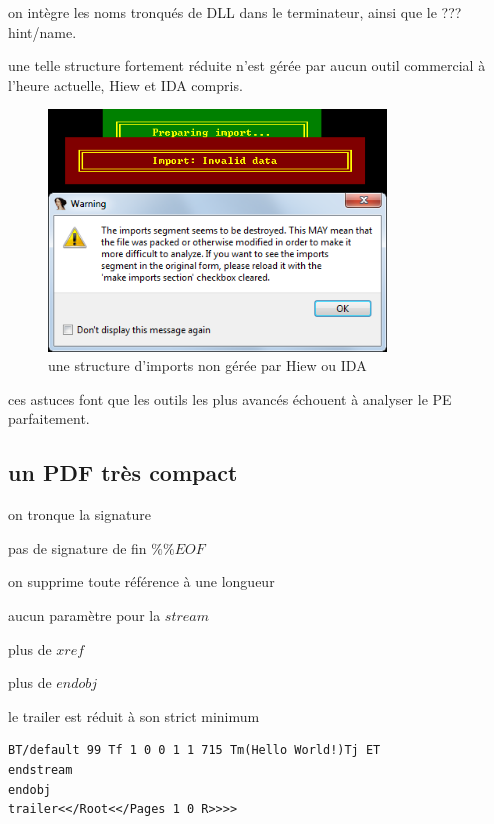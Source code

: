 \begin{itemize}
on intègre les noms tronqués de DLL dans le terminateur, ainsi que le ??? hint/name.

une telle structure fortement réduite n'est gérée par aucun outil commercial à l'heure actuelle, Hiew et IDA compris.

\begin{figure}[ht]
  \centering
  \includegraphics[width=0.8\textwidth]{albertini/img/imports_error}
  \caption{une structure d'imports non gérée par Hiew ou IDA}
  \label{fig:albertini:imports_error}
\end{figure}

ces astuces font que les outils les plus avancés échouent à analyser le PE parfaitement.

\end{itemize}

\subsection{un PDF très compact}
on tronque la signature

pas de signature de fin $\%\%EOF$

on supprime toute référence à une longueur

aucun paramètre pour la $stream$

plus de $xref$

plus de $endobj$

le trailer est réduit à son strict minimum
\begin{lstlisting}[language={},caption={un PDF réduit au minimum},label={lst:albertini:reducedPDF}]
%PDF- 1 0 obj<</Kids[<</Parent 1 0 R/Contents[2 0 R]>>]/Resources<<>>>>2 0 obj<<>>stream
BT/default 99 Tf 1 0 0 1 1 715 Tm(Hello World!)Tj ET
endstream
endobj
trailer<</Root<</Pages 1 0 R>>>>
\end{lstlisting}

